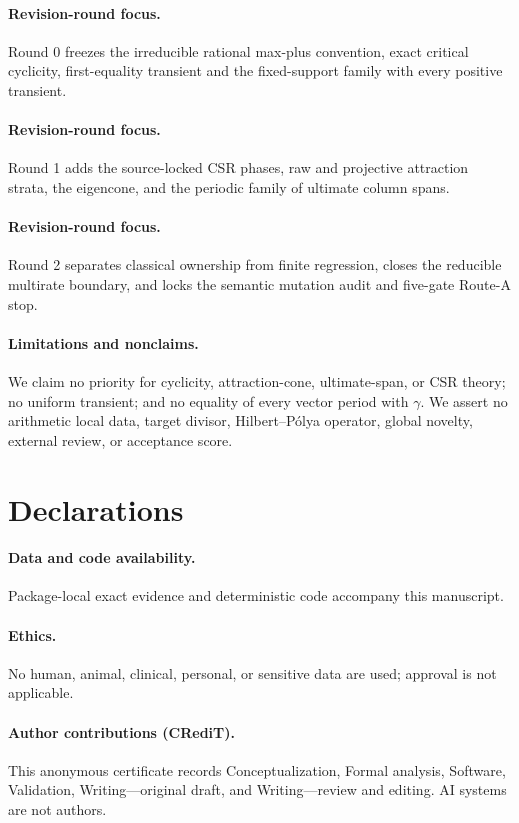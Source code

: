 \documentclass[9pt]{extarticle}
\begin{document}
\ifcase\CRevisionRound
\paragraph{Revision-round focus.} Round 0 freezes the irreducible rational
max-plus convention, exact critical cyclicity, first-equality transient and
the fixed-support family with every positive transient.
\or
\paragraph{Revision-round focus.} Round 1 adds the source-locked CSR phases,
raw and projective attraction strata, the eigencone, and the periodic family
of ultimate column spans.
\or
\paragraph{Revision-round focus.} Round 2 separates classical ownership from
finite regression, closes the reducible multirate boundary, and locks the
semantic mutation audit and five-gate Route-A stop.
\fi

\paragraph{Limitations and nonclaims.}
We claim no priority for cyclicity, attraction-cone, ultimate-span, or CSR
theory; no uniform transient; and no equality of every vector period with
$\gamma$.  We assert no arithmetic local data, target divisor,
Hilbert--P\'olya operator, global novelty, external review, or acceptance score.

\section*{Declarations}
\paragraph{Data and code availability.} Package-local exact evidence and
deterministic code accompany this manuscript.
\paragraph{Ethics.} No human, animal, clinical, personal, or sensitive data
are used; approval is not applicable.
\paragraph{Author contributions (CRediT).} This anonymous certificate records
Conceptualization, Formal analysis, Software, Validation, Writing---original
draft, and Writing---review and editing. AI systems are not authors.
\end{document}
